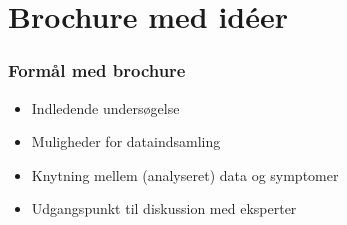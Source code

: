 \section{Brochure med idéer}

\begin{frame}
\frametitle{Formål med brochure}

\begin{itemize}
\item Indledende undersøgelse
\item Muligheder for dataindsamling
\item Knytning mellem (analyseret) data og symptomer
\item Udgangspunkt til diskussion med eksperter
\end{itemize}

\end{frame}
